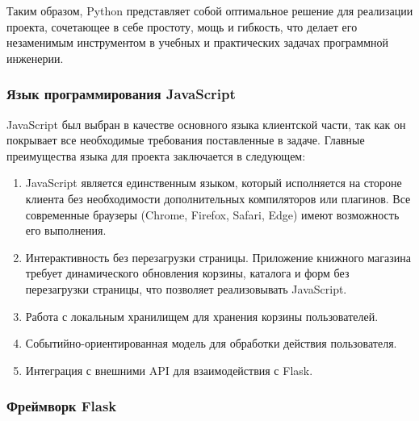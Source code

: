 Таким образом, Python представляет собой оптимальное решение для реализации проекта, сочетающее в себе простоту, мощь и гибкость, что делает его незаменимым инструментом в учебных и практических задачах программной инженерии.

\subsubsection{Язык программирования JavaScript}

JavaScript был выбран в качестве основного языка клиентской части, так как он покрывает все необходимые требования поставленные в задаче. Главные преимущества языка для проекта заключается в следующем:
 
\begin{enumerate}
	\item JavaScript является единственным языком, который исполняется на стороне клиента без необходимости дополнительных компиляторов или плагинов. Все современные браузеры (Chrome, Firefox, Safari, Edge) имеют возможность его выполнения.
	\item Интерактивность без перезагрузки страницы. Приложение книжного магазина требует динамического обновления корзины, каталога и форм без перезагрузки страницы, что позволяет реализовывать JavaScript.
	\item Работа с локальным хранилищем для хранения корзины пользователей.
	\item Событийно-ориентированная модель для обработки действия пользователя.
	\item Интеграция с внешними API для взаимодействия с Flask.
\end{enumerate}

\subsubsection{Фреймворк Flask}

